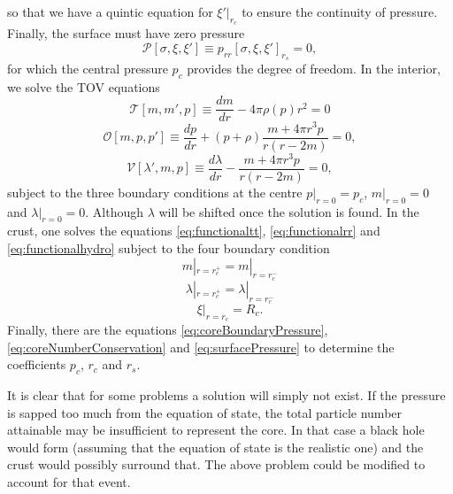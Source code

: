 so that we have a quintic equation for $\xi'|_{r_c}$ to ensure the continuity of pressure. Finally, the surface must have zero pressure
\begin{equation}
\mathcal{P}[\sigma,\xi,\xi'] \equiv p_{rr}[\sigma,\xi,\xi']_{r_s} = 0,
\label{eq:surfacePressure}
\end{equation}
for which the central pressure $p_c$ provides the degree of freedom. In the interior, we solve the TOV equations
\begin{equation}
\mathcal{T}[m,m',p] \equiv \frac{dm}{dr} - 4\pi\rho(p) r^2=0
\label{eq:tovrr}
\end{equation}
\begin{equation}
\mathcal{O}[m,p,p'] \equiv \frac{dp}{dr} + (p+\rho)\frac{m+4\pi r^3p}{r(r-2m)} = 0,
\label{eq:tovhydro}
\end{equation}
\begin{equation}
\mathcal{V}[\lambda',m,p] \equiv \frac{d\lambda}{dr} - \frac{m+4\pi r^3p}{r(r-2m)} = 0,
\label{eq:tovtt}
\end{equation}
subject to the three boundary conditions at the centre $p|_{r=0} = p_c$, $m|_{r=0}=0$ and $\lambda|_{r=0}=0$. Although $\lambda$ will be shifted once the solution is found. In the crust, one solves the equations \eqref{eq:functionaltt}, \eqref{eq:functionalrr} and \eqref{eq:functionalhydro} subject to the four boundary condition 
\begin{equation}
m|_{r=r_c^+}=m|_{r=r_c^-}
\end{equation}
\begin{equation}\lambda|_{r=r_c^+}=\lambda|_{r=r_c^-}
\end{equation}
\begin{equation}
\xi|_{r=r_c}=R_c.
\end{equation}
Finally, there are the equations \eqref{eq:coreBoundaryPressure}, \eqref{eq:coreNumberConservation} and \eqref{eq:surfacePressure} to determine the coefficients $p_c$, $r_c$ and $r_s$.

It is clear that for some problems a solution will simply not exist. If the pressure is sapped too much from the equation of state, the total particle number attainable may be insufficient to represent the core. In that case a black hole would form (assuming that the equation of state is the realistic one) and the crust would possibly surround that. The above problem could be modified to account for that event.
